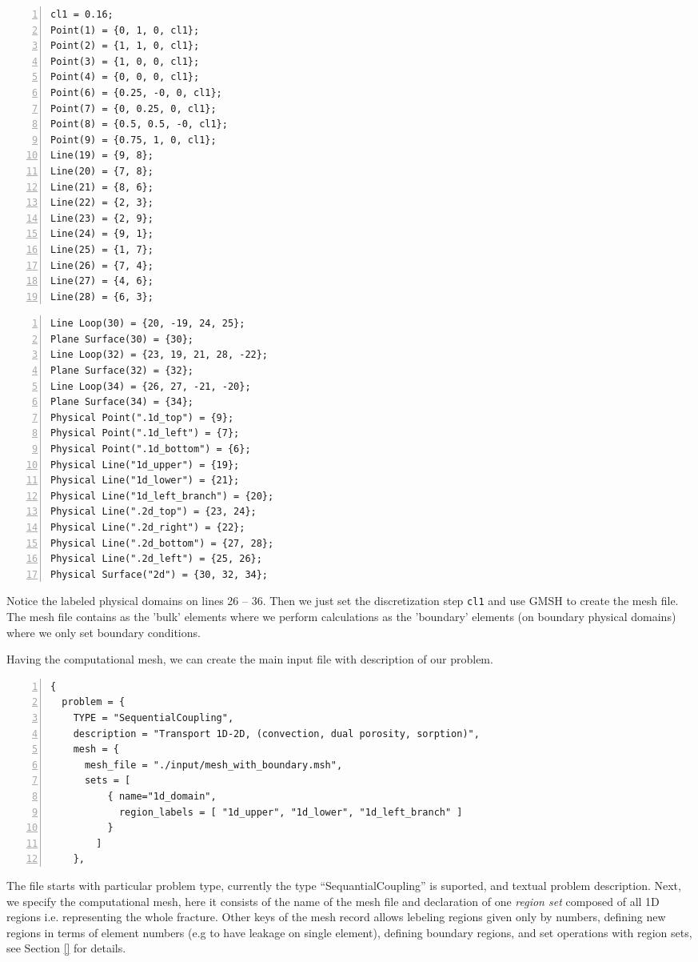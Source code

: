 \documentclass[12pt,a4paper]{report}
\begin{document}
\begin{multicols}{2}
{\small
\begin{Verbatim}[numbers=left]
cl1 = 0.16;
Point(1) = {0, 1, 0, cl1};
Point(2) = {1, 1, 0, cl1};
Point(3) = {1, 0, 0, cl1};
Point(4) = {0, 0, 0, cl1};
Point(6) = {0.25, -0, 0, cl1};
Point(7) = {0, 0.25, 0, cl1};
Point(8) = {0.5, 0.5, -0, cl1};
Point(9) = {0.75, 1, 0, cl1};
Line(19) = {9, 8};
Line(20) = {7, 8};
Line(21) = {8, 6};
Line(22) = {2, 3};
Line(23) = {2, 9};
Line(24) = {9, 1};
Line(25) = {1, 7};
Line(26) = {7, 4};
Line(27) = {4, 6};
Line(28) = {6, 3};
\end{Verbatim}
\columnbreak
\begin{Verbatim}[numbers=left, firstnumber=last]
Line Loop(30) = {20, -19, 24, 25};
Plane Surface(30) = {30};
Line Loop(32) = {23, 19, 21, 28, -22};
Plane Surface(32) = {32};
Line Loop(34) = {26, 27, -21, -20};
Plane Surface(34) = {34};
Physical Point(".1d_top") = {9};
Physical Point(".1d_left") = {7};
Physical Point(".1d_bottom") = {6};
Physical Line("1d_upper") = {19};
Physical Line("1d_lower") = {21};
Physical Line("1d_left_branch") = {20};
Physical Line(".2d_top") = {23, 24};
Physical Line(".2d_right") = {22};
Physical Line(".2d_bottom") = {27, 28};
Physical Line(".2d_left") = {25, 26};
Physical Surface("2d") = {30, 32, 34};
\end{Verbatim}
}
\end{multicols}

Notice the labeled physical domains on lines 26 -- 36. Then we just set the discretization step \verb'cl1' and use GMSH to create the mesh file.
The mesh file contains as the 'bulk' elements where we perform calculations as the 'boundary' elements (on boundary physical domains) where we only set boundary conditions.

\pagebreak
Having the computational mesh, we can create the main input file with description of our problem. 
\begin{Verbatim}[numbers=left]
{
  problem = {
    TYPE = "SequentialCoupling", 
    description = "Transport 1D-2D, (convection, dual porosity, sorption)", 
    mesh = {
      mesh_file = "./input/mesh_with_boundary.msh",
      sets = [
          { name="1d_domain", 
            region_labels = [ "1d_upper", "1d_lower", "1d_left_branch" ]
          }
        ]
    },  
\end{Verbatim}
The file starts with particular problem type, currently the type ``SequantialCoupling'' is suported, and textual problem description.
Next, we specify the computational mesh, here it consists of the name of the mesh file and declaration of one {\it region set} 
composed of all 1D regions i.e. representing the whole fracture. Other keys of the mesh record allows lebeling regions given only by numbers, 
defining new regions in terms of element numbers (e.g to have leakage on single element), 
defining boundary regions, and set operations with region sets, see Section \ref{} for details.
\end{document}
